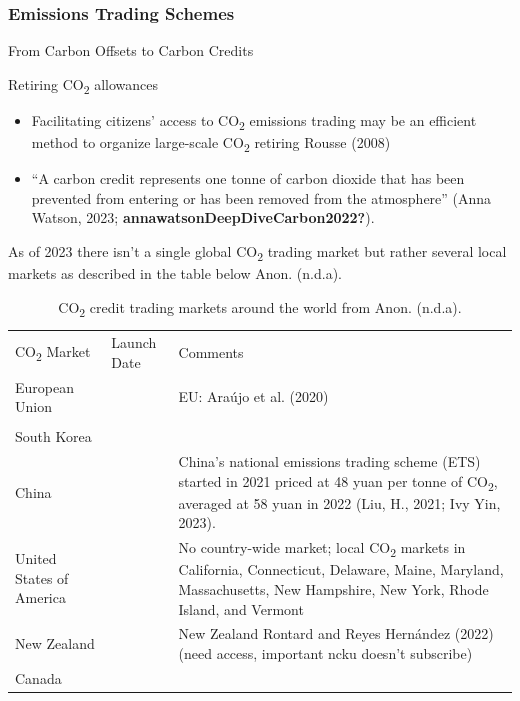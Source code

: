 \documentclass[
  letterpaper,
  DIV=11,
  numbers=noendperiod]{scrartcl}
\providecommand{\tightlist}{%
  \setlength{\itemsep}{0pt}\setlength{\parskip}{0pt}}\usepackage{longtable,booktabs,array}
\begin{document}
\subsubsection{Emissions Trading
Schemes}\label{emissions-trading-schemes}

From Carbon Offsets to Carbon Credits

Retiring CO\textsubscript{2} allowances

\begin{itemize}
\tightlist
\item
  Facilitating citizens' access to CO\textsubscript{2} emissions trading
  may be an efficient method to organize large-scale CO\textsubscript{2}
  retiring Rousse (2008)
\item
  ``A carbon credit represents one tonne of carbon dioxide that has been
  prevented from entering or has been removed from the atmosphere''
  (Anna Watson, 2023; \textbf{annawatsonDeepDiveCarbon2022?}).
\end{itemize}

As of 2023 there isn't a single global CO\textsubscript{2} trading
market but rather several local markets as described in the table below
Anon. (n.d.a).

\begin{longtable}[]{@{}
  >{\raggedright\arraybackslash}p{}
  >{\raggedright\arraybackslash}p{}
  >{\raggedright\arraybackslash}p{}@{}}
\caption{CO\textsubscript{2} credit trading markets around the world
from Anon. (n.d.a).}\tabularnewline
\toprule\noalign{}
\endfirsthead
\endhead
\bottomrule\noalign{}
\endlastfoot
CO\textsubscript{2} Market & Launch Date & Comments \\
European Union & 2005 & EU: Araújo et al. (2020) \\
& & \\
South Korea & 2015 & \\
China & 2021 & China's national emissions trading scheme (ETS) started
in 2021 priced at 48 yuan per tonne of CO\textsubscript{2}, averaged at
58 yuan in 2022 (Liu, H., 2021; Ivy Yin, 2023). \\
United States of America & 2013 & No country-wide market; local
CO\textsubscript{2} markets in California, Connecticut, Delaware, Maine,
Maryland, Massachusetts, New Hampshire, New York, Rhode Island, and
Vermont \\
New Zealand & 2008 & New Zealand Rontard and Reyes Hernández (2022)
(need access, important ncku doesn't subscribe) \\
Canada & 2013 & \\
\end{longtable}
\end{document}
